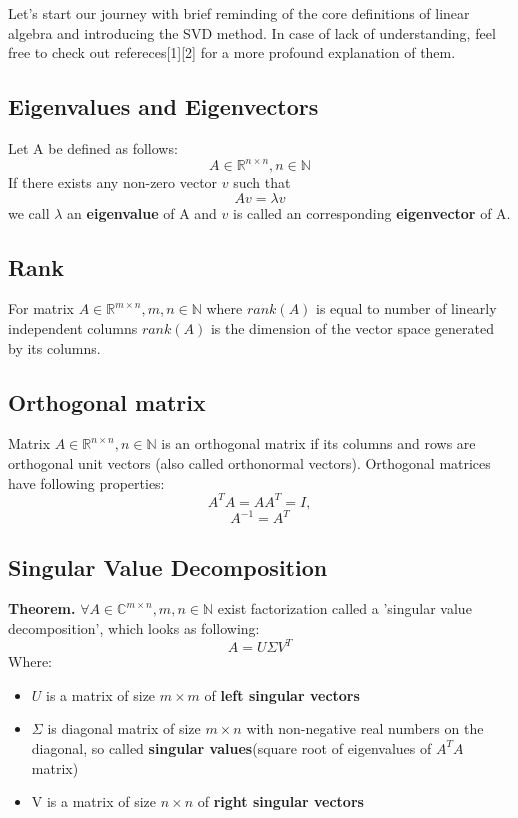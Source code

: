 Let's start our journey with brief reminding of the core definitions of linear algebra and introducing the SVD method. In case of lack of understanding, feel free to check out refereces[1][2] for a more profound explanation of them.

\subsection{Eigenvalues and Eigenvectors}

Let A be defined as follows: 
\[
A \in \mathbb{R}^{n \times n}, n \in \mathbb{N}
\]
If there exists any non-zero vector $v$ such that 
\[
Av = \lambda v
\]
we call $\lambda$ an \textbf{eigenvalue} of A and $v$ is called an corresponding \textbf{eigenvector} of A.

\subsection{Rank}

For matrix $A \in \mathbb{R}^{m \times n}, m,n \in \mathbb{N}$ where $rank(A)$ is equal to number of linearly independent columns $rank(A)$ is the dimension of the vector space generated by its columns.

\subsection{Orthogonal matrix}
Matrix $A \in \mathbb{R}^{n \times n}, n \in \mathbb{N}$ is an orthogonal matrix if its columns and rows are orthogonal unit vectors (also called orthonormal vectors).
Orthogonal matrices have following properties:
\[
	A^TA=AA^T=I,
\]
\[
	A^{-1} = A^T 
\]

\subsection{Singular Value Decomposition}
\textbf{Theorem.} $\forall A \in \mathbb{C}^{m \times n}, m, n \in \mathbb{N}$ exist factorization called a 'singular value decomposition', which looks as following:
\[
A = U \Sigma V^T
\]
Where:
\begin{itemize}
	\item $U$ is a matrix of size $m \times m$ of \textbf{left singular vectors}
	\item $\Sigma$ is diagonal matrix of size $m \times n$ with non-negative real numbers on the diagonal, so called \textbf{singular values}(square root of eigenvalues of $A^TA$ matrix)
	\item V is a matrix of size $n \times n$ of \textbf{right singular vectors}
\end{itemize}

